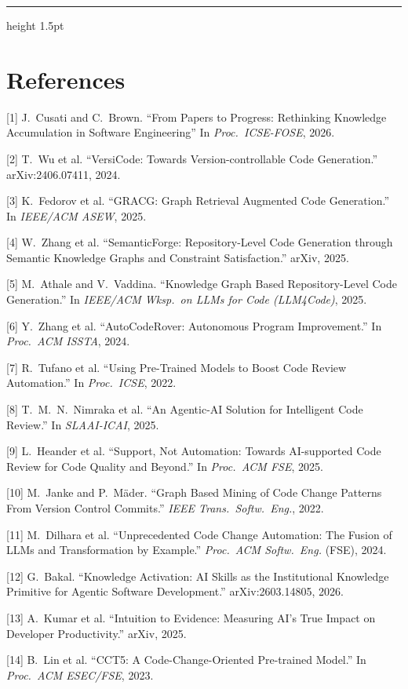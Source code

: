 \documentclass[11pt, letterpaper]{article}
\newcommand{\ehr}{{\color{gray!60}\hrule height 1.5pt}}
\begin{document}
\ehr

\section*{References}
\label{sec:references}

\small
[1] J.~Cusati and C.~Brown. ``From Papers to Progress: Rethinking Knowledge Accumulation in Software Engineering'' In \textit{Proc.\ ICSE-FOSE}, 2026.

[2] T.~Wu et al. ``VersiCode: Towards Version-controllable Code Generation.'' arXiv:2406.07411, 2024.

[3] K.~Fedorov et al. ``GRACG: Graph Retrieval Augmented Code Generation.'' In \textit{IEEE/ACM ASEW}, 2025.

[4] W.~Zhang et al. ``SemanticForge: Repository-Level Code Generation through Semantic Knowledge Graphs and Constraint Satisfaction.'' arXiv, 2025.

[5] M.~Athale and V.~Vaddina. ``Knowledge Graph Based Repository-Level Code Generation.'' In \textit{IEEE/ACM Wksp.\ on LLMs for Code (LLM4Code)}, 2025.

[6] Y.~Zhang et al. ``AutoCodeRover: Autonomous Program Improvement.'' In \textit{Proc.\ ACM ISSTA}, 2024.

[7] R.~Tufano et al. ``Using Pre-Trained Models to Boost Code Review Automation.'' In \textit{Proc.\ ICSE}, 2022.

[8] T.~M.~N.~Nimraka et al. ``An Agentic-AI Solution for Intelligent Code Review.'' In \textit{SLAAI-ICAI}, 2025.

[9] L.~Heander et al. ``Support, Not Automation: Towards AI-supported Code Review for Code Quality and Beyond.'' In \textit{Proc.\ ACM FSE}, 2025.

[10] M.~Janke and P.~M\"ader. ``Graph Based Mining of Code Change Patterns From Version Control Commits.'' \textit{IEEE Trans.\ Softw.\ Eng.}, 2022.

[11] M.~Dilhara et al. ``Unprecedented Code Change Automation: The Fusion of LLMs and Transformation by Example.'' \textit{Proc.\ ACM Softw.\ Eng.} (FSE), 2024.

[12] G.~Bakal. ``Knowledge Activation: AI Skills as the Institutional Knowledge Primitive for Agentic Software Development.'' arXiv:2603.14805, 2026.

[13] A.~Kumar et al. ``Intuition to Evidence: Measuring AI's True Impact on Developer Productivity.'' arXiv, 2025.

[14] B.~Lin et al. ``CCT5: A Code-Change-Oriented Pre-trained Model.'' In \textit{Proc.\ ACM ESEC/FSE}, 2023.
\end{document}

